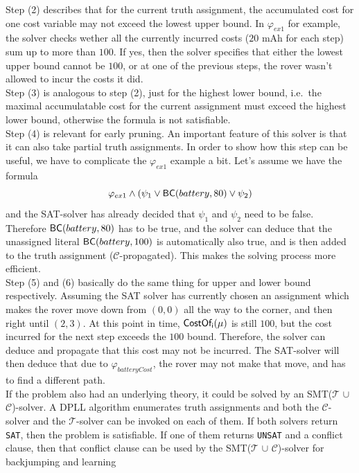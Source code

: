 \documentclass{amsart}
\theoremstyle{definition}
\theoremstyle{remark}
\numberwithin{equation}{section}
\def\T{$\mathcal{T}$}
\def\C{$\mathcal{C}$}
\def\sat{\texttt{SAT}}
\def\unsat{\texttt{UNSAT}}
\begin{document}
    Step (2) describes that for the current truth assignment, the accumulated cost for one cost variable may not exceed the lowest upper bound. In $\varphi_{ex1}$ for example, the solver checks wether all the currently incurred costs ($20$ mAh for each step) sum up to more than $100$. If yes, then the solver specifies that either the lowest upper bound cannot be $100$, or at one of the previous steps, the rover wasn't allowed to incur the costs it did. \\

    Step (3) is analogous to step (2), just for the highest lower bound, i.e.\ the maximal accumulatable cost for the current assignment must exceed the highest lower bound, otherwise the formula is not satisfiable. \\

    Step (4) is relevant for early pruning. An important feature of this solver is that it can also take partial truth assignments. In order to show how this step can be useful, we have to complicate the $\varphi_{ex1}$ example a bit. Let's assume we have the formula 
    \begin{equation*}
      \varphi_{ex1} \land (\psi_1 \lor \operatorname{\sf BC \rm}(battery, 80) \lor \psi_2)
    \end{equation*}
    and the SAT-solver has already decided that $\psi_1$ and $\psi_2$ need to be false. Therefore $\operatorname{\sf BC \rm}(battery, 80)$ has to be true, and the solver can deduce that the unassigned literal $\operatorname{\sf BC \rm}(battery, 100)$ is automatically also true, and is then added to the truth assignment (\C{}-propagated). This makes the solving process more efficient. \\

    Step (5) and (6) basically do the same thing for upper and lower bound respectively. Assuming the SAT solver has currently chosen an assignment which makes the rover move down from $(0,0)$ all the way to the corner, and then right until $(2,3)$. At this point in time, $\operatorname{\sf CostOf_i \rm}(\mu)$ is still $100$, but the cost incurred for the next step exceeds the $100$ bound. Therefore, the solver can deduce and propagate that this cost may not be incurred. The SAT-solver will then deduce that due to $\varphi_{batteryCost}$, the rover may not make that move, and has to find a different path. \\

    If the problem also had an underlying theory, it could be solved by an SMT(\T{} $\cup$ \C{})-solver. A DPLL algorithm enumerates truth assignments and both the \C{}-solver and the \T{}-solver can be invoked on each of them. If both solvers return \sat{}, then the problem is satisfiable. If one of them returns \unsat{} and a conflict clause, then that conflict clause can be used by the SMT(\T{} $\cup$ \C{})-solver for backjumping and learning
\end{document}
